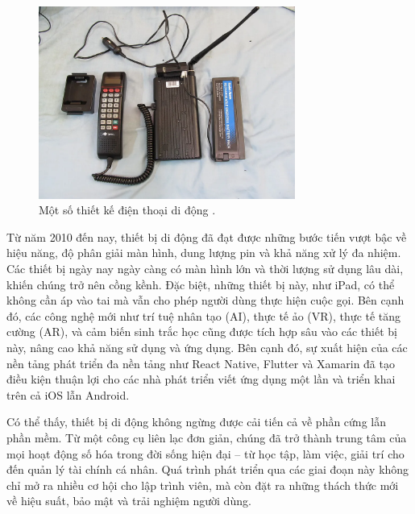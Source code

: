     \begin{figure}[H]
      \centering
      \includegraphics[width=0.75\textwidth]{images/thiet_ke_dtdd.png}
      \caption{Một số thiết kế điện thoại di động \cite{androidcentral2021}.}
      \label{fig:fig2}
    \end{figure}


  \hspace*{0.8cm}
  Từ năm 2010 đến nay, thiết bị di động đã đạt được những bước tiến vượt bậc về hiệu năng, độ phân giải màn hình, dung lượng pin và khả năng xử lý đa nhiệm. Các thiết bị ngày nay ngày càng có màn hình lớn và thời lượng sử dụng lâu dài, khiến chúng trở nên cồng kềnh. Đặc biệt, những thiết bị này, như iPad, có thể không cần áp vào tai mà vẫn cho phép người dùng thực hiện cuộc gọi. Bên cạnh đó, các công nghệ mới như trí tuệ nhân tạo (AI), thực tế ảo (VR), thực tế tăng cường (AR), và cảm biến sinh trắc học cũng được tích hợp sâu vào các thiết bị này, nâng cao khả năng sử dụng và ứng dụng. Bên cạnh đó, sự xuất hiện của các nền tảng phát triển đa nền tảng như React Native, Flutter và Xamarin đã tạo điều kiện thuận lợi cho các nhà phát triển viết ứng dụng một lần và triển khai trên cả iOS lẫn Android.

  \vspace{0.5em}

  \hspace*{0.8cm}Có thể thấy, thiết bị di động không ngừng được cải tiến cả về phần cứng lẫn phần mềm. Từ một công cụ liên lạc đơn giản, chúng đã trở thành trung tâm của mọi hoạt động số hóa trong đời sống hiện đại – từ học tập, làm việc, giải trí cho đến quản lý tài chính cá nhân. Quá trình phát triển qua các giai đoạn này không chỉ mở ra nhiều cơ hội cho lập trình viên, mà còn đặt ra những thách thức mới về hiệu suất, bảo mật và trải nghiệm người dùng.


